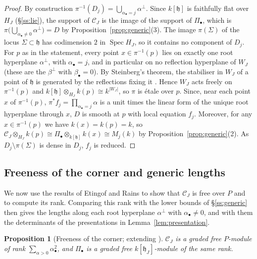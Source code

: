 \documentclass[11pt]{amsart}
\numberwithin{table}{section}
\numberwithin{figure}{section}
\numberwithin{equation}{section}
\newtheorem{prop}[thm]{Proposition}
\theoremstyle{definition}
\theoremstyle{plain}
\newcommand{\cC}{\mathcal{C}}
\newcommand{\h}{\mathfrak{h}}
\newcommand{\bul}{\bullet}
\DeclareMathOperator{\Spec}{Spec}
\begin{document}
\begin{proof}
By construction $\pi^{-1}(D_j) = \bigcup_{\alpha_\bul = j} \alpha^\perp$. Since $k[\h]$ is faithfully flat over $H_J$ (\S\ref{ss:lie}), the support of $\cC_J$ is the image of the support of $\Pi_\bul$, which is $\pi\big(\bigcup_{\alpha_\bul \neq 0} \alpha^\perp\big) = D$ by Proposition~\ref{prop:generic}(3). The image $\pi(\Sigma)$ of the locus $\Sigma \subset \h$ has codimension $2$ in $\Spec H_J$, so it contains no component of $D_j$. For $p$ as in the statement, every point $x \in \pi^{-1}(p)$ lies on exactly one root hyperplane $\alpha^\perp$, with $\alpha_\bul = j$, and in particular on no reflection hyperplane of $W_J$ (these are the $\beta^\perp$ with $\beta_\bul = 0$). By Steinberg's theorem, the stabiliser in $W_J$ of a point of $\h$ is generated by the reflections fixing it \cite[Thm~1.5]{Ste}. Hence $W_J$ acts freely on $\pi^{-1}(p)$ and $k[\h] \otimes_{H_J} k(p) \cong k^{|W_J|}$, so $\pi$ is \'etale over $p$. Since, near each point $x$ of $\pi^{-1}(p)$, $\pi^*f_j = \prod_{\alpha_\bul = j} \alpha$ is a unit times the linear form of the unique root hyperplane through $x$, $D$ is smooth at $p$ with local equation $f_j$. Moreover, for any $x \in \pi^{-1}(p)$ we have $k(x) = k(p) = k$, so $\cC_J \otimes_{H_J} k(p) \cong \Pi_\bul \otimes_{k[\h]} k(x) \cong M_j(k)$ by Proposition~\ref{prop:generic}(2). As $D_j \setminus \pi(\Sigma)$ is dense in $D_j$, $f_j$ is reduced.
\end{proof}

\subsection{\texorpdfstring{Freeness of the corner and generic lengths}{Freeness of the corner and generic lengths}}\label{ss:free}

We now use the results of Etingof and Rains to show that $\cC_J$ is free over $P$ and to compute its rank. Comparing this rank with the lower bounds of \S\ref{ss:generic} then gives the lengths along each root hyperplane $\alpha^\perp$ with $\alpha_\bul \neq 0$, and with them the determinants of the presentations in Lemma~\ref{lem:presentation}.

\begin{prop}[{Freeness of the corner; extending \cite[Thm~3.3(i)]{ER}}]\label{prop:ER}
$\cC_J$ is a graded free $P$-module of rank $\sum_{\alpha>0} \alpha_\bul^2$, and $\Pi_\bul$ is a graded free $k[\h_J]$-module of the same rank.
\end{prop}
\end{document}
